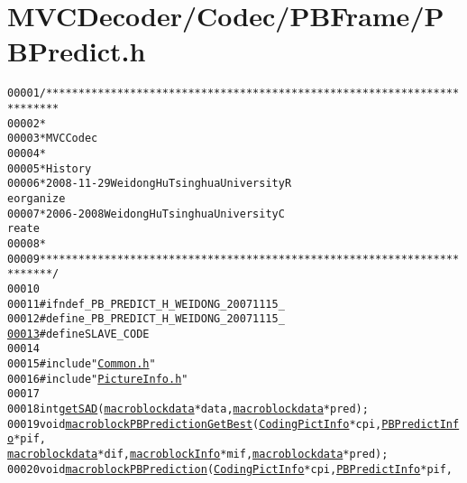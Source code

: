 \hypertarget{_m_v_c_decoder_2_codec_2_p_b_frame_2_p_b_predict_8h_source}{
\section{MVCDecoder/Codec/PBFrame/PBPredict.h}
}


\begin{footnotesize}\begin{alltt}
00001 \textcolor{comment}{/************************************************************************}
00002 \textcolor{comment}{ *}
00003 \textcolor{comment}{ * MVC Codec}
00004 \textcolor{comment}{ * }
00005 \textcolor{comment}{ * History}
00006 \textcolor{comment}{ * 2008-11-29           Weidong Hu              Tsinghua University             R
      eorganize}
00007 \textcolor{comment}{ * 2006-2008            Weidong Hu              Tsinghua University             C
      reate}
00008 \textcolor{comment}{ * }
00009 \textcolor{comment}{ ************************************************************************/}
00010 
00011 \textcolor{preprocessor}{#ifndef \_PB\_PREDICT\_H\_WEIDONG\_20071115\_}
00012 \textcolor{preprocessor}{}\textcolor{preprocessor}{#define \_PB\_PREDICT\_H\_WEIDONG\_20071115\_}
\hypertarget{_m_v_c_decoder_2_codec_2_p_b_frame_2_p_b_predict_8h_source_l00013}{}\hyperlink{_m_v_c_decoder_2_codec_2_p_b_frame_2_p_b_predict_8h_a995f6a4907273b8d56b6543ab1a57d17}{00013} \textcolor{preprocessor}{}\textcolor{preprocessor}{#define SLAVE\_CODE}
00014 \textcolor{preprocessor}{}
00015 \textcolor{preprocessor}{#include "\hyperlink{_common_8h}{Common.h}"}
00016 \textcolor{preprocessor}{#include "\hyperlink{_picture_info_8h}{PictureInfo.h}"}
00017 
00018 \textcolor{keywordtype}{int} \hyperlink{_m_v_c_common_lib_2_codec_2_p_b_predict_8cpp_a1ebf436cd932cc02e36d3e20c24f7a73}{getSAD}(\hyperlink{structmacroblockdata}{macroblockdata} *data, \hyperlink{structmacroblockdata}{macroblockdata} *pred);
00019 \textcolor{keywordtype}{void} \hyperlink{_m_v_c_decoder_2_codec_2_p_b_frame_2_p_b_predict_8h_a9c58c454b324f51dd72a2dde41c3a25d}{macroblockPBPredictionGetBest}(\hyperlink{struct_coding_pict_info}{CodingPictInfo} *cpi, \hyperlink{struct_p_b_predict_info}{PBPredictInfo} *pif, 
      \hyperlink{structmacroblockdata}{macroblockdata} *dif, \hyperlink{structmacroblock_info}{macroblockInfo} *mif, \hyperlink{structmacroblockdata}{macroblockdata} *pred);
00020 \textcolor{keywordtype}{void} \hyperlink{_m_v_c_common_lib_2_codec_2_p_b_predict_8cpp_a9bf71cd5cc7efb47cefa4dc05a66d1a0}{macroblockPBPrediction}(\hyperlink{struct_coding_pict_info}{CodingPictInfo} *cpi, \hyperlink{struct_p_b_predict_info}{PBPredictInfo} *pif, 

\end{alltt}
\end{footnotesize}
